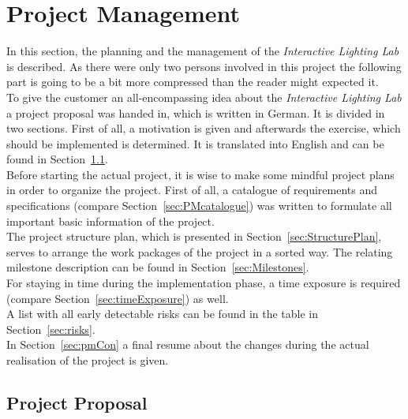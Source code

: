 \section{Project Management} \label{sec:pm}

In this section, the planning and the management of the \textit{Interactive Lighting Lab} is described. As there were only two persons involved in this project the following part is going to be a bit more compressed than the reader might expected it.\\
To give the customer an all-encompassing idea about the \textit{Interactive Lighting Lab} a project proposal was handed in, which is written in German. It is divided in two sections. First of all, a motivation is given and afterwards the exercise, which should be implemented is determined. It is translated into English and can be found in Section~\ref{sec:ProjectProposal}. \\ 
Before starting the actual project, it is wise to make some mindful project plans in order to organize the project. First of all, a catalogue of requirements and specifications (compare Section~\ref{sec:PMcatalogue}) was written to formulate all important basic information of the project. \\
The project structure plan, which is presented in Section~\ref{sec:StructurePlan}, serves to arrange the work packages of the project in a sorted way. The relating milestone description can be found in Section~\ref{sec:Milestones}. \\
For staying in time during the implementation phase, a time exposure is required (compare Section~\ref{sec:timeExposure}) as well.\\
A list with all early detectable risks can be found in the table in Section~\ref{sec:risks}.\\
In Section~\ref{sec:pmCon} a final resume about the changes during the actual realisation of the project is given. 


\subsection{Project Proposal}\label{sec:ProjectProposal}


